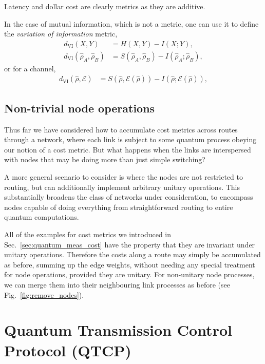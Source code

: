 \documentclass[aps,rmp,twocolumn,amsmath,amssymb,nofootinbib,superscriptaddress,longbibliography,floatfix]{revtex4-1}
\begin{document}
Latency and dollar cost are clearly metrics as they are additive.

In the case of mutual information, which is not a metric, one can use it to define the \emph{variation of information} metric,
\begin{align}
d_\mathrm{VI}(X,Y) &= H(X,Y) - I(X;Y), \nonumber \\
d_\mathrm{VI}(\hat\rho_A,\hat\rho_B) &= S(\hat\rho_A,\hat\rho_B) - I(\hat\rho_A;\hat\rho_B),
\end{align}
or for a channel,
\begin{align}
d_\mathrm{VI}(\hat\rho,\mathcal{E}) &= S(\hat\rho,\mathcal{E}(\hat\rho)) - I(\hat\rho;\mathcal{E}(\hat\rho)),
\end{align}

%
%

\subsection{Non-trivial node operations}

Thus far we have considered how to accumulate cost metrics across routes through a network, where each link is subject to some quantum process obeying our notion of a cost metric. But what happens when the links are interspersed with nodes that may be doing more than just simple switching?

A more general scenario to consider is where the nodes are not restricted to routing, but can additionally implement arbitrary unitary operations. This substantially broadens the class of networks under consideration, to encompass nodes capable of doing everything from straightforward routing to entire quantum computations.

All of the examples for cost metrics we introduced in Sec.~\ref{sec:quantum_meas_cost} have the property that they are invariant under unitary operations. Therefore the costs along a route may simply be accumulated as before, summing up the edge weights, without needing any special treatment for node operations, provided they are unitary. For non-unitary node processes, we can merge them into their neighbouring link processes as before (see Fig.~\ref{fig:remove_nodes}).

%
%

\section{Quantum Transmission Control Protocol (QTCP)}
\end{document}
